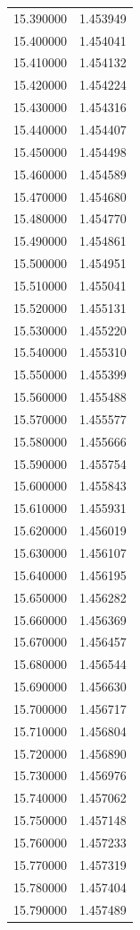 \begin{tabular}{rr}
15.390000 & 1.453949 \\
15.400000 & 1.454041 \\
15.410000 & 1.454132 \\
15.420000 & 1.454224 \\
15.430000 & 1.454316 \\
15.440000 & 1.454407 \\
15.450000 & 1.454498 \\
15.460000 & 1.454589 \\
15.470000 & 1.454680 \\
15.480000 & 1.454770 \\
15.490000 & 1.454861 \\
15.500000 & 1.454951 \\
15.510000 & 1.455041 \\
15.520000 & 1.455131 \\
15.530000 & 1.455220 \\
15.540000 & 1.455310 \\
15.550000 & 1.455399 \\
15.560000 & 1.455488 \\
15.570000 & 1.455577 \\
15.580000 & 1.455666 \\
15.590000 & 1.455754 \\
15.600000 & 1.455843 \\
15.610000 & 1.455931 \\
15.620000 & 1.456019 \\
15.630000 & 1.456107 \\
15.640000 & 1.456195 \\
15.650000 & 1.456282 \\
15.660000 & 1.456369 \\
15.670000 & 1.456457 \\
15.680000 & 1.456544 \\
15.690000 & 1.456630 \\
15.700000 & 1.456717 \\
15.710000 & 1.456804 \\
15.720000 & 1.456890 \\
15.730000 & 1.456976 \\
15.740000 & 1.457062 \\
15.750000 & 1.457148 \\
15.760000 & 1.457233 \\
15.770000 & 1.457319 \\
15.780000 & 1.457404 \\
15.790000 & 1.457489 \\

\end{tabular}
